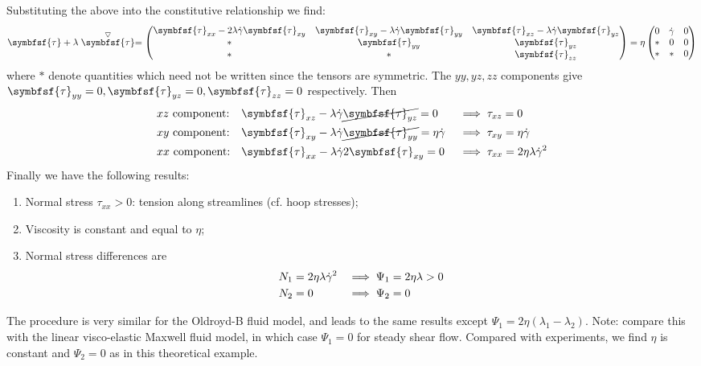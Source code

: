 \documentclass{jknotes}
\begin{document}
Substituting the above into the constitutive relationship we find:
\begin{equation}
	\symbfsf{\tau} + \lambda \stackrel{\bigtriangledown}{\symbfsf{\tau}} =
	\begin{pmatrix} \symbfsf{\tau}_{xx} - 2\lambda \srate \symbfsf{\tau}_{xy}
		& \symbfsf{\tau}_{xy} - \lambda \srate \symbfsf{\tau}_{yy} &
		\symbfsf{\tau}_{xz} - \lambda \srate \symbfsf{\tau}_{yz} \\ * &
		\symbfsf{\tau}_{yy} & \symbfsf{\tau}_{yz} \\
		* & * &\symbfsf{\tau}_{zz}
	\end{pmatrix} = \eta \begin{pmatrix} 0 & \srate & 0 \\ * & 0 & 0 \\ * & *
										   & 0 \end{pmatrix}
\end{equation}
where $*$ denote quantities which need not be written since the tensors are
symmetric. The $yy, yz, zz$ components give $\symbfsf{\tau}_{yy} = 0,
\symbfsf{\tau}_{yz} = 0, \symbfsf{\tau}_{zz} = 0$ respectively. Then
\begin{align}
	&xz \,\,\text{component:} &&\symbfsf{\tau}_{xz} - \lambda \srate
	\cancel{\symbfsf{\tau}_{yz}} = 0 &&\implies \tau_{xz} = 0\\
	&xy \,\,\text{component:} &&\symbfsf{\tau}_{xy} - \lambda \srate
	\cancel{\symbfsf{\tau}_{yy}} = \eta \srate &&\implies \tau_{xy} = \eta \srate\\
	&xx \,\,\text{component:} &&\symbfsf{\tau}_{xx} - \lambda \srate
	2\symbfsf{\tau}_{xy} = 0 &&\implies \tau_{xx} =
	2\eta\lambda\srate^2
\end{align}
Finally we have the following results:
\begin{enumerate}
	\item Normal stress $\tau_{xx} > 0$: tension along streamlines (cf. hoop
		stresses);
	\item Viscosity is constant and equal to $\eta$;
	\item Normal stress differences are 
		\begin{align}
			N_1 &= 2\eta \lambda \dot{\gamma}^2 &\implies \Psi_1 &= 2 \eta \lambda > 0
			\\
			N_2 &= 0 &\implies \Psi_2 &= 0
		\end{align}
\end{enumerate}
The procedure is very similar for the Oldroyd-B fluid model, and leads to the
same results except $\Psi_1 = 2\eta (\lambda_1-\lambda_2)$. Note: compare this
with the linear visco-elastic Maxwell fluid model, in which case $\Psi_1 = 0$
for steady shear flow. Compared with experiments, we find $\eta$ is constant
and $\Psi_2 = 0$ as in this theoretical example.
\end{document}
